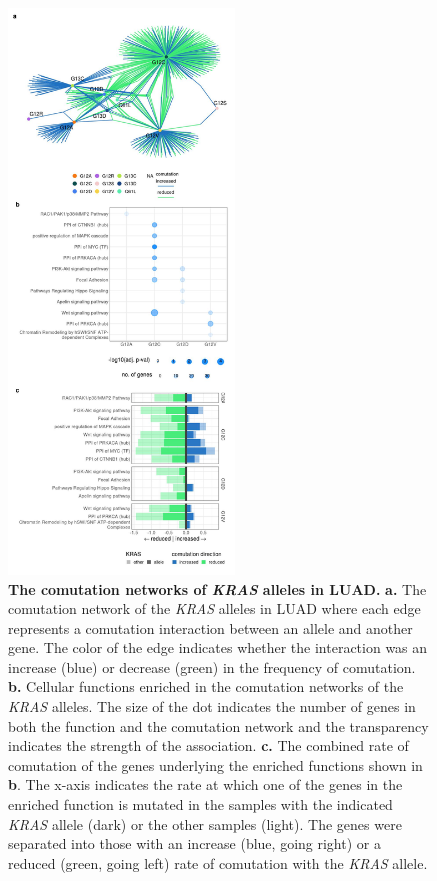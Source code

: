 \documentclass[english, 12pt, letterpaper]{article}
\newcommand{\KRAS}{\emph{KRAS}}
\begin{document}
\begin{figure}
\centering
\includegraphics[height=150mm]{figures/Figure_03.jpeg}
\caption{
    \textbf{The comutation networks of \KRAS{} alleles in LUAD.}
    \textbf{a.} The comutation network of the \KRAS{} alleles in LUAD where each edge represents a comutation interaction between an allele and another gene. The color of the edge indicates whether the interaction was an increase (blue) or decrease (green) in the frequency of comutation.
    \textbf{b.} Cellular functions enriched in the comutation networks of the \KRAS{} alleles. The size of the dot indicates the number of genes in both the function and the comutation network and the transparency indicates the strength of the association.
    \textbf{c.} The combined rate of comutation of the genes underlying the enriched functions shown in \textbf{b}. The x-axis indicates the rate at which one of the genes in the enriched function is mutated in the samples with the indicated \KRAS{} allele (dark) or the other samples (light). The genes were separated into those with an increase (blue, going right) or a reduced (green, going left) rate of comutation with the \KRAS{} allele.
}
\label{fig:luad-comutation-main}
\end{figure}
\end{document}

